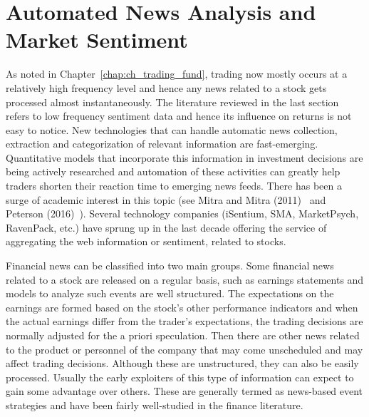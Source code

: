 \section{Automated News Analysis and Market Sentiment}


As noted in Chapter~\ref{chap:ch_trading_fund}, trading now mostly occurs at a relatively high frequency level and hence any news related to a stock gets processed almost instantaneously. The literature reviewed in the last section refers to low frequency sentiment data and hence its influence on returns is not easy to notice. New technologies that can handle automatic news collection, extraction and categorization of relevant information are fast-emerging. Quantitative models that incorporate this information in investment decisions are being actively researched and automation of these activities can greatly help traders shorten their reaction time to emerging news feeds. There has been a surge of academic interest in this topic (see Mitra and Mitra (2011)~\cite{mitra2} and Peterson (2016)~\cite{peterson}). Several technology companies (iSentium, SMA, MarketPsych, RavenPack, etc.) have sprung up in the last decade offering the service of aggregating the web information or sentiment, related to stocks. 


Financial news can be classified into two main groups. Some financial news related to a stock are released on a regular basis, such as earnings statements and models to analyze such events are well structured. The expectations on the earnings are formed based on the stock's other performance indicators and when the actual earnings differ from the trader's expectations, the trading decisions are normally adjusted for the a priori speculation. Then there are other news related to the product or personnel of the company that may come unscheduled and may affect trading decisions. Although these are unstructured, they can also be easily processed. Usually the early exploiters of this type of information can expect to gain some advantage over others. These are generally termed as news-based event strategies and have been fairly well-studied in the finance literature. 



